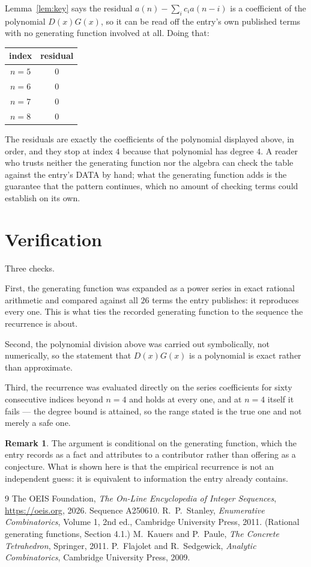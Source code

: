 \documentclass[11pt,a4paper]{article}
\theoremstyle{plain}
\theoremstyle{definition}
\newtheorem{remark}[theorem]{Remark}
\begin{document}
Lemma~\ref{lem:key} says the residual $a(n)-\sum_ic_ia(n-i)$ is a coefficient of the
polynomial $D(x)G(x)$, so it can be read off the entry's own published terms with no
generating function involved at all. Doing that:
\begin{center}
\begin{tabular}{cc}
index & residual \\ \hline
$n=5$ & $0$ \\
$n=6$ & $0$ \\
$n=7$ & $0$ \\
$n=8$ & $0$
\end{tabular}
\end{center}
The residuals are exactly the coefficients of the polynomial displayed above, in order, and
they stop at index $4$ because that polynomial has degree $4$. A reader who trusts
neither the generating function nor the algebra can check the table against the entry's DATA
by hand; what the generating function adds is the guarantee that the pattern continues, which
no amount of checking terms could establish on its own.

\section{Verification}

Three checks.

First, the generating function was expanded as a power series in exact rational arithmetic and
compared against all $26$ terms the entry publishes: it reproduces every one. This is
what ties the recorded generating function to the sequence the recurrence is about.

Second, the polynomial division above was carried out symbolically, not numerically, so the
statement that $D(x)G(x)$ is a polynomial is exact rather than approximate.

Third, the recurrence was evaluated directly on the series coefficients for sixty consecutive
indices beyond $n=4$ and holds at every one, and at $n=4$ itself it fails --- the
degree bound is attained, so the range stated is the true one and not merely a safe one.

\begin{remark}
The argument is conditional on the generating function, which the entry records as a fact and
attributes to a contributor rather than offering as a conjecture. What is shown here is that
the empirical recurrence is not an independent guess: it is equivalent to information the
entry already contains.
\end{remark}

\begin{thebibliography}{9}
 The OEIS Foundation, \emph{The On-Line Encyclopedia of Integer
Sequences}, \url{https://oeis.org}, 2026. Sequence A250610.
 R.~P.~Stanley, \emph{Enumerative Combinatorics}, Volume 1, 2nd ed.,
Cambridge University Press, 2011. (Rational generating functions, Section 4.1.)
 M.~Kauers and P.~Paule, \emph{The Concrete Tetrahedron}, Springer, 2011.
 P.~Flajolet and R.~Sedgewick, \emph{Analytic Combinatorics}, Cambridge
University Press, 2009.
\end{thebibliography}
\end{document}
